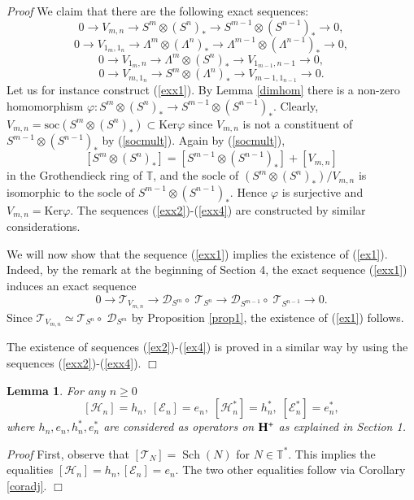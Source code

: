 \documentclass[11pt]{amsart}
\newcounter{theorem}
\newtheorem{lemma}[theo]{Lemma}
\renewenvironment{proof}{ \emph{Proof}}{$\Box$}
\newcommand{\TT}{\mathbb{T}}
\renewcommand {\phi} {\varphi}
\newcommand{\soc}{\mathrm{soc}}
\newcommand{\Ker}{\mathrm{Ker}}
\begin{document}
\begin{proof} We claim that there are the following exact sequences:
\begin{equation}\label{exx1}
0\rightarrow V_{m,n}\rightarrow S^m\otimes (S^n)_*\rightarrow S^{m-1}\otimes (S^{n-1})_*\rightarrow 0,
\end{equation}
\begin{equation}\label{exx2}
0\rightarrow V_{1_m,1_n}\rightarrow \Lambda^m\otimes (\Lambda^n)_*\rightarrow\Lambda^{m-1}\otimes (\Lambda^{n-1})_*\rightarrow 0,
\end{equation}
\begin{equation}\label{exx3}
0\rightarrow V_{1_m,n}\rightarrow \Lambda^m\otimes (S^n)_*\rightarrow V_{1_{m-1},n-1}\rightarrow 0,
\end{equation}
\begin{equation}\label{exx4}
0\rightarrow V_{m,1_n}\rightarrow S^m\otimes(\Lambda^n)_*\rightarrow V_{m-1,1_{n-1}}\rightarrow 0.
\end{equation}
Let us for instance construct (\ref{exx1}). By Lemma \ref{dimhom} there is a non-zero
homomorphism $\phi:S^m\otimes (S^n)_*\rightarrow S^{m-1}\otimes (S^{n-1})_*$. Clearly, 
$V_{m,n}=\soc(S^m\otimes (S^n)_*)\subset \Ker\phi$ since $V_{m,n}$ is not a
constituent of $S^{m-1}\otimes (S^{n-1})_*$ by (\ref{socmult}). Again by (\ref{socmult}),
$$[S^m\otimes (S^n)_*]=[S^{m-1}\otimes (S^{n-1})_*]+[V_{m,n}]$$
in the Grothendieck ring of $\mathbb T$, and the socle of  $(S^m\otimes (S^n)_*)/V_{m,n}$
is isomorphic to the socle of $S^{m-1}\otimes (S^{n-1})_*$. Hence $\phi$
is surjective and $V_{m,n}=\Ker\phi$.
The sequences (\ref{exx2})-(\ref{exx4}) are constructed by similar considerations.

We will now show that the sequence (\ref{exx1}) implies the existence
of (\ref{ex1}). Indeed, by the remark at the beginning of Section 4, the exact sequence 
(\ref{exx1}) induces  an exact sequence
$$0\rightarrow \mathcal T_{V_{m,n}}\rightarrow\mathcal D_{S^m}\circ\; \mathcal T_{S^n}\rightarrow \mathcal D_{S^{m-1}}\circ\; \mathcal T_{S^{n-1}}\rightarrow 0.$$
Since $\mathcal T_{V_{m,n}}\simeq \mathcal T_{S^n}\circ\;\mathcal D_{S^m}$ by Proposition \ref{prop1}, the existence of 
(\ref{ex1}) follows.

The existence of sequences (\ref{ex2})-(\ref{ex4}) is proved in a
similar way by using the sequences (\ref{exx2})-(\ref{exx4}).
\end{proof}

\begin{lemma}\label{pass} For any $n\geq 0$
$$[\mathcal H_n]=h_n ,\; [\mathcal E_n]=e_n,\;[\mathcal H_n^*]=h_n^*,\; [\mathcal E_n^*]=e_n^*,$$
where $h_n,e_n,h_n^*,e_n^*$ are considered as operators on $\bold{H}^+$
as explained in Section 1. 
\end{lemma}
\begin{proof} First, observe that $[\mathcal T_N]=\operatorname{Sch}(N)$ for $N\in\TT^*$. This implies the equalities $[\mathcal H_n]=h_n , [\mathcal E_n]=e_n$.
The two other equalities follow via  Corollary \ref{coradj}. 
\end{proof}
\end{document}
